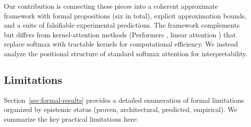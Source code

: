 \documentclass[11pt]{article}
\theoremstyle{definition}
\begin{document}
Our contribution is connecting these pieces into a coherent approximate framework with formal propositions (six in total), explicit approximation bounds, and a suite of falsifiable experimental predictions. The framework complements but differs from kernel-attention methods (Performers \cite{choromanski2021performers}, linear attention \cite{katharopoulos2020linear}) that replace softmax with tractable kernels for computational efficiency. We instead analyze the positional structure of standard softmax attention for interpretability.

\subsection{Limitations}

Section~\ref{sec:formal-results} provides a detailed enumeration of formal limitations organized by epistemic status (proven, architectural, predicted, empirical). We summarize the key practical limitations here:
\end{document}

